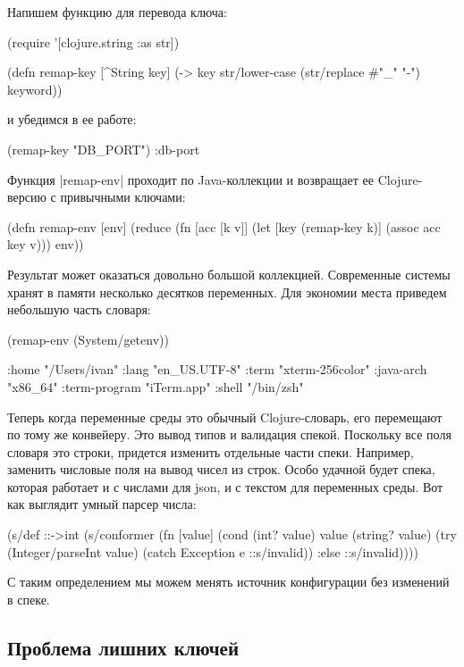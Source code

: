Напишем функцию для перевода ключа:

\begin{code}
(require '[clojure.string :as str])

(defn remap-key
  [^String key]
  (-> key
      str/lower-case
      (str/replace #"_" "-")
      keyword))
\end{code}

и убедимся в ее работе:

\begin{code}
(remap-key "DB_PORT")
:db-port
\end{code}

Функция \spverb|remap-env| проходит по Java-коллекции и возвращает ее Clojure-версию с
привычными ключами:

\begin{code}
(defn remap-env
  [env]
  (reduce
   (fn [acc [k v]]
     (let [key (remap-key k)]
       (assoc acc key v)))
   {}
   env))
\end{code}

Результат может оказаться довольно большой коллекцией. Современные системы
хранят в памяти несколько десятков переменных. Для экономии места приведем
небольшую часть словаря:

\begin{code}
(remap-env (System/getenv))

{:home "/Users/ivan"
 :lang "en_US.UTF-8"
 :term "xterm-256color"
 :java-arch "x86_64"
 :term-program "iTerm.app"
 :shell "/bin/zsh"}
\end{code}

Теперь когда переменные среды это обычный Clojure-словарь, его перемещают по
тому же конвейеру. Это вывод типов и валидация спекой. Поскольку все поля
словаря это строки, придется изменить отдельные части спеки. Например, заменить
числовые поля на вывод чисел из строк. Особо удачной будет спека, которая
работает и с числами для json, и с текстом для переменных среды. Вот как
выглядит умный парсер числа:

\begin{code}
(s/def ::->int
  (s/conformer
   (fn [value]
     (cond
       (int? value) value
       (string? value)
       (try (Integer/parseInt value)
            (catch Exception e
              ::s/invalid))
       :else ::s/invalid))))
\end{code}

С таким определением мы можем менять источник конфигурации без изменений в
спеке.

\subsection{Проблема лишних ключей}

